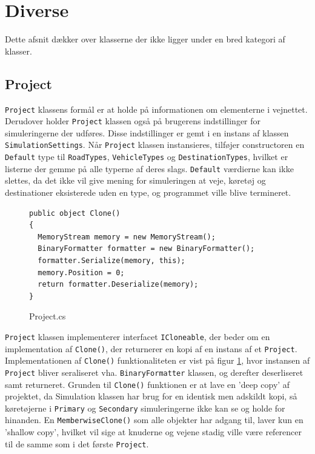 \section{Diverse}\label{Diverse}
Dette afsnit dækker over klasserne der ikke ligger under en bred kategori af klasser.

\subsection*{Project}
\texttt{Project} klassens formål er at holde på informationen om elementerne i vejnettet. Derudover holder \texttt{Project} klassen også på brugerens indstillinger for simuleringerne der udføres. Disse indstillinger er gemt i en instans af klassen \texttt{SimulationSettings}. Når \texttt{Project} klassen instansieres, tilføjer constructoren en \texttt{Default} type til \texttt{RoadTypes}, \texttt{VehicleTypes} og \texttt{DestinationTypes}, hvilket er listerne der gemme på alle typerne af deres slags. \texttt{Default} værdierne kan ikke slettes, da det ikke vil give mening for simuleringen at veje, køretøj og destinationer eksisterede uden en type, og programmet ville blive termineret. 

\begin{figure}[H]
\begin{lstlisting} 
public object Clone()
{
  MemoryStream memory = new MemoryStream();
  BinaryFormatter formatter = new BinaryFormatter();
  formatter.Serialize(memory, this);
  memory.Position = 0;
  return formatter.Deserialize(memory);
}
\end{lstlisting}
\caption{Project.cs}\label{Project}
\end{figure}

\texttt{Project} klassen implementerer interfacet \texttt{ICloneable}, der beder om en implementation af \texttt{Clone()}, der returnerer en kopi af en instans af et \texttt{Project}. Implementationen af \texttt{Clone()} funktionaliteten er vist på figur \ref{Project}, hvor instansen af \texttt{Project} bliver seraliseret vha. \texttt{BinaryFormatter} klassen, og derefter deserliseret samt returneret. Grunden til \texttt{Clone()} funktionen er at lave en 'deep copy' af projektet, da Simulation klassen har brug for en identisk men adskildt kopi, så køretøjerne i \texttt{Primary} og \texttt{Secondary} simuleringerne ikke kan se og holde for hinanden. En \texttt{MemberwiseClone()} som alle objekter har adgang til, laver kun en 'shallow copy', hvilket vil sige at knuderne og vejene stadig ville være referencer til de samme som i det første \texttt{Project}.

